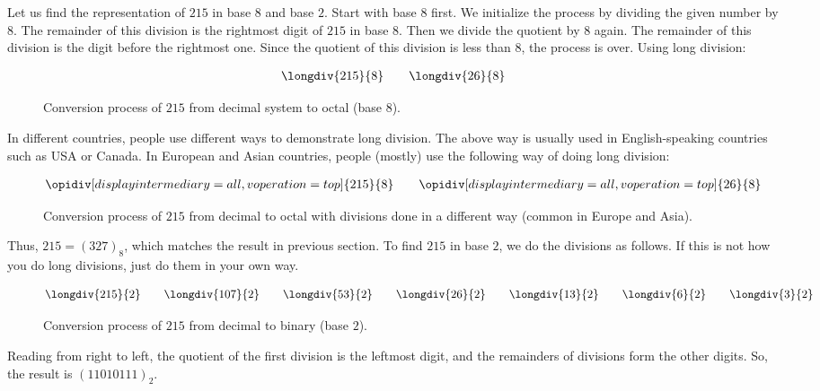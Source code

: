 \begin{example}
	Let us find the representation of $215$ in base $8$ and base $2$. Start with base $8$ first. We initialize the process by dividing the given number by $8$. The remainder of this division is the rightmost digit of $215$ in base $8$. Then we divide the quotient by $8$ again. The remainder of this division is the digit before the rightmost one. Since the quotient of this division is less than $8$, the process is over. Using long division:
		\begin{figure}[H]
			\begin{align*}
			\longdiv{215}{8}
			\qquad
			\longdiv{26}{8}
		\end{align*}
	\caption{Conversion process of $215$ from decimal system to octal (base $8$).}
	\label{fig:base8-1}
		\end{figure}
	In different countries, people use different ways to demonstrate long division. The above way is usually used in English-speaking countries such as USA or Canada. In European and Asian countries, people (mostly) use the following way of doing long division:
		\begin{figure}[H]
			\begin{align*}
			\opidiv[displayintermediary=all,voperation=top]{215}{8}
			\qquad
			\opidiv[displayintermediary=all,voperation=top]{26}{8}
			\end{align*}
		\caption{Conversion process of $215$ from decimal to octal with divisions done in a different way (common in Europe and Asia).}
		\label{fig:base8-2}
		\end{figure}
	Thus, $215=(327)_8$, which matches the result in previous section. To find $215$ in base $2$, we do the divisions as follows. If this is not how you do long divisions, just do them in your own way.
	\begin{figure}[H]
	\begin{align*}
		\longdiv{215}{2}
		\qquad
		\longdiv{107}{2}
		\qquad
		\longdiv{53}{2}
		\qquad
		\longdiv{26}{2}
		\qquad
		\longdiv{13}{2}
		\qquad
		\longdiv{6}{2}
		\qquad
		\longdiv{3}{2}
	\end{align*}
	\caption{Conversion process of $215$ from decimal to binary (base $2$).}
	\label{fig:base2}
	\end{figure}
	Reading from right to left, the quotient of the first division is the leftmost digit, and the remainders of divisions form the other digits. So, the result is $(11010111)_2$.
\end{example}

